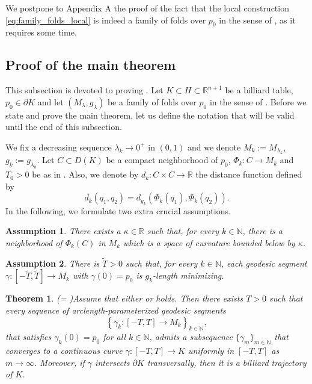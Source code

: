 \documentclass[11pt]{article}
\theoremstyle{definition}
\theoremstyle{remark}
\theoremstyle{plain}
\newtheorem{assumption}{Assumption}[section]
\newtheorem{theorem}[definition]{Theorem}
\newcommand{\R}{\mathbb{R}}
\newcommand{\N}{\mathbb{N}}
\begin{document}
We postpone to Appendix A the proof of the fact that the local construction \cref{eq:family_folds_local} is indeed a family of folds over $p_0$ in the sense of , as it requires some time.


\subsection{Proof of the main theorem}

This subsection is devoted to proving . Let $K\subset H\subset \R^{n+1}$ be a billiard table, $p_0\in \partial K$ and let $(M_\lambda,g_\lambda)$ be a family of folds over $p_0$ in the sense of . Before we state and prove the main theorem, let us define the notation that will be valid until the end of this subsection.

We fix a decreasing sequence $\lambda_k\to 0^+$ in $(0,1)$ and we denote
$M_k:= M_{\lambda_k}$, $g_k:= g_{\lambda_k}$. Let $C\subset D(K)$ be a compact neighborhood of $p_0$, $\Phi_k: C\to M_k$ and $T_0>0$ be as in . Also, we denote by $d_k:C\times C\to \R$ the distance function defined by 
$$d_k(q_1,q_2)= d_{g_k}(\Phi_k(q_1),\Phi_k(q_2)).$$
In the following, we formulate two extra crucial assumptions.

\begin{assumption}\label{ass:assumption1}
There exists a $\kappa\in \R$ such that, for every $k\in \N$, there is a neighborhood of $\Phi_k(C)$ in $M_k$ which is a space of curvature bounded below by $\kappa$.
\end{assumption}

\begin{assumption}\label{ass:assumption2}
There is $\tilde T>0$ such that, for every $k\in \N$, each geodesic segment $\gamma:[-\tilde T,\tilde T]\to M_k$ with $\gamma(0) = p_0$ is $g_k$-length minimizing.
\end{assumption}



\begin{theorem}(= )\label{thm:main_theorem_sec3}
Assume that either  or  holds. Then there exists $T>0$ such that every sequence of arclength-parameterized geodesic segments
$$\left\{\gamma_k:[-T,T]\rightarrow M_k\right\}_{k\in \N},$$
that satisfies $\gamma_k(0)=p_0$ for all $k\in\N$, admits a subsequence $\{\gamma_m\}_{m\in \N}$ that converges to a continuous curve $\gamma:[-T,T]\rightarrow K$ uniformly in $[-T,T]$ as $m\rightarrow \infty$. Moreover, if $\gamma$ intersects $\partial K$ transversally, then it is a billiard trajectory of $K$.

\end{theorem}
\end{document}
